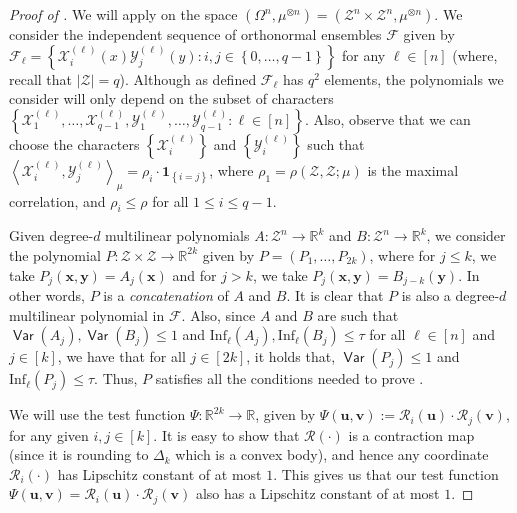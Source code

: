 \documentclass[11pt]{article}
\newcommand{\inbrace}[1]{\left \{ #1 \right \}}
\newcommand{\inangle}[1]{\left \langle #1 \right \rangle}
\newcommand{\set}[1]{\inbrace{#1}}
\newcommand{\setdef}[2]{\set{#1 : #2}}
\DeclareMathOperator*{\Var}{\mathsf{Var}}
\newcommand{\bbR}{{\mathbb R}}
\newcommand{\bu}{{\bm u}}
\newcommand{\bv}{{\bm v}}
\newcommand{\bx}{{\bm x}}
\newcommand{\by}{{\bm y}}
\newcommand{\calF}{\mathcal{F}}
\newcommand{\calR}{\mathcal{R}}
\newcommand{\calX}{\mathcal{X}}
\newcommand{\calY}{\mathcal{Y}}
\newcommand{\calZ}{\mathcal{Z}}
\newcommand{\Inf}{\mathrm{Inf}}
\begin{document}
\begin{proof}[Proof of ]
We will apply  on the space $(\Omega^n, \mu^{\otimes n}) = (\calZ^n \times \calZ^n, \mu^{\otimes n})$. We consider the independent sequence of orthonormal ensembles $\calF$ given by $\calF_\ell = \setdef{\calX^{(\ell)}_i(x) \calY^{(\ell)}_j(y)}{i, j \in \set{0, \ldots, q-1}}$ for any $\ell \in [n]$ (where, recall that $|\calZ| = q$). Although as defined $\calF_\ell$ has $q^2$ elements, the polynomials we consider will only depend on the subset of characters $\setdef{\calX^{(\ell)}_1, \ldots, \calX^{(\ell)}_{q-1}, \calY^{(\ell)}_1, \ldots, \calY^{(\ell)}_{q-1}}{\ell \in [n]}$. Also, observe that we can choose the characters $\set{\calX^{(\ell)}_i}$ and $\set{\calY^{(\ell)}_i}$ such that $\inangle{\calX^{(\ell)}_i, \calY^{(\ell)}_j}_\mu = \rho_i \cdot \mathbf{1}_{\set{i=j}}$, where $\rho_1 = \rho(\calZ, \calZ; \mu)$ is the maximal correlation, and $\rho_i \le \rho$ for all $1 \le i \le q-1$.

Given degree-$d$ multilinear polynomials $A : \calZ^n \to \bbR^k$ and $B : \calZ^n \to \bbR^k$, we consider the polynomial $P : \calZ \times \calZ \to \bbR^{2k}$ given by $P = (P_1, \ldots, P_{2k})$, where for $j \le k$, we take $P_j(\bx, \by) = A_j(\bx)$ and for $j > k$, we take $P_j(\bx, \by) = B_{j-k}(\by)$. In other words, $P$ is a {\em concatenation} of $A$ and $B$. It is clear that $P$ is also a degree-$d$ multilinear polynomial in $\calF$. Also, since $A$ and $B$ are such that $\Var(A_j), \Var(B_j) \le 1$ and $\Inf_\ell(A_j), \Inf_\ell(B_j) \le \tau$ for all $\ell \in [n]$ and $j \in [k]$, we have that for all $j \in [2k]$, it holds that, $\Var(P_j) \le 1$ and $\Inf_\ell(P_j) \le \tau$. Thus, $P$ satisfies all the conditions needed to prove .

We will use the test function $\Psi : \bbR^{2k} \to \bbR$, given by $\Psi(\bu,\bv) := \calR_i(\bu) \cdot \calR_j(\bv)$, for any given $i, j \in [k]$. It is easy to show that $\calR(\cdot)$ is a contraction map (since it is rounding to $\Delta_k$ which is a convex body), and hence any coordinate $\calR_i(\cdot)$ has Lipschitz constant of at most $1$. This gives us that our test function $\Psi(\bu, \bv) = \calR_i(\bu) \cdot \calR_j(\bv)$ also has a Lipschitz constant of at most $1$.


\end{proof}
\end{document}
